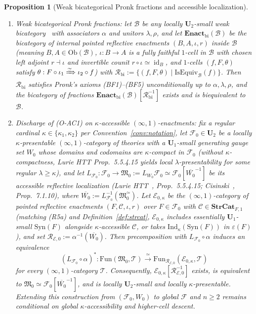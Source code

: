 \documentclass[11pt]{article}
\theoremstyle{plain}
\newtheorem{proposition}[theorem]{Proposition}
\theoremstyle{definition}
\newcommand{\cF}{\mathcal{F}}
\newcommand{\cC}{\mathcal{C}}
\newcommand{\fM}{\mathfrak{M}}
\newcommand{\Ob}{\mathrm{Ob}}
\newcommand{\Fun}{\mathrm{Fun}}
\newcommand{\Syn}{\mathrm{Syn}}
\newcommand{\cE}{\mathcal{E}}
\DeclareMathOperator{\id}{id}
\begin{document}
\begin{proposition}[Weak bicategorical Pronk fractions and accessible localization]\label{prop:ac-oc-accessible-loc}
\begin{enumerate}[nosep,label=(\roman*)]
\item \emph{Weak bicategorical Pronk fractions}: let $\mathcal{B}$ be any locally $\mathbf{U}_2$-small weak bicategory~\cite{Benabou1967} with associators $\alpha$ and unitors $\lambda, \rho$, and let $\mathbf{Enact}_{\mathrm{bi}}(\mathcal{B})$ be the bicategory of internal pointed reflective enactments $(B, A, \iota, r)$ inside $\mathcal{B}$ (meaning $B, A \in \Ob(\mathcal{B})$, $\iota : B \to A$ is a fully faithful $1$-cell in $\mathcal{B}$ with chosen left adjoint $r \dashv \iota$ and invertible counit $r \circ \iota \simeq \id_B$, and $1$-cells $(f, F, \theta)$ satisfy $\theta : F \circ \iota_1 \xRightarrow{\simeq} \iota_2 \circ f$) with $\mathcal{R}_{\mathrm{bi}} := \{(f, F, \theta) \mid \mathrm{IsEquiv}_{\mathcal{B}}(f)\}$. Then $\mathcal{R}_{\mathrm{bi}}$ satisfies Pronk's axioms \textup{(BF1)--(BF5)} unconditionally up to $\alpha, \lambda, \rho$, and the bicategory of fractions $\mathbf{Enact}_{\mathrm{bi}}(\mathcal{B})[\mathcal{R}_{\mathrm{bi}}^{-1}]$ exists and is biequivalent to $\mathcal{B}$.
\item \emph{Discharge of \textup{(O-AC1)} on $\kappa$-accessible $(\infty, 1)$-enactments}: fix a regular cardinal $\kappa \in \{\kappa_1, \kappa_2\}$ per Convention~\ref{conv:notation}, let $\cF_0 \in \mathbf{U}_2$ be a locally $\kappa$-presentable $(\infty, 1)$-category of theories with a $\mathbf{U}_1$-small generating gauge set $W_0$ whose domains and codomains are $\kappa$-compact in $\cF_0$ (without $\kappa$-compactness, Lurie HTT Prop.~5.5.4.15 yields local $\lambda$-presentability for some regular $\lambda \ge \kappa$), and let $L_{\cF_0} : \cF_0 \to \fM_0 := L_{W_0}\cF_0 \simeq \cF_0[\overline{W_0}^{-1}]$ be its accessible reflective localization (Lurie HTT~\cite{LurieHTT}, Prop.~5.5.4.15; Cisinski~\cite{Cisinski2019}, Prop.~7.1.10), where $\overline{W_0} := L_{\cF_0}^{-1}(\fM_0^{\simeq})$. Let $\cE_{0, \kappa}$ be the $(\infty, 1)$-category of pointed reflective enactments $(F, \cC, \iota, r)$ over $F \in \cF_0$ with $\cC \in \mathbf{StrCat}_{F, 1}$ (matching \textup{(R5a)} and Definition~\ref{def:strcat}, $\cE_{0, \kappa}$ includes essentially $\mathbf{U}_1$-small $\Syn(F)$ alongside $\kappa$-accessible $\cC$, or takes $\mathrm{Ind}_\kappa(\Syn(F))$ in $\varepsilon(F)$), and set $\mathcal{R}_{\cE, 0} := \alpha^{-1}(\overline{W_0})$. Then precomposition with $L_{\cF_0} \circ \alpha$ induces an equivalence
\[
  (L_{\cF_0} \circ \alpha)^* : \Fun(\fM_0, \mathcal{T}) \xrightarrow{\;\simeq\;} \Fun_{\mathcal{R}_{\cE, 0}}(\cE_{0, \kappa}, \mathcal{T})
\]
for every $(\infty, 1)$-category $\mathcal{T}$. Consequently, $\cE_{0, \kappa}[\mathcal{R}_{\cE, 0}^{-1}]$ exists, is equivalent to $\fM_0 \simeq \cF_0[\overline{W_0}^{-1}]$, and is locally $\mathbf{U}_2$-small and locally $\kappa$-presentable. Extending this construction from $(\cF_0, W_0)$ to global $\cF$ and $n \ge 2$ remains conditional on global $\kappa$-accessibility and higher-cell descent.
\end{enumerate}
\end{proposition}
\end{document}
